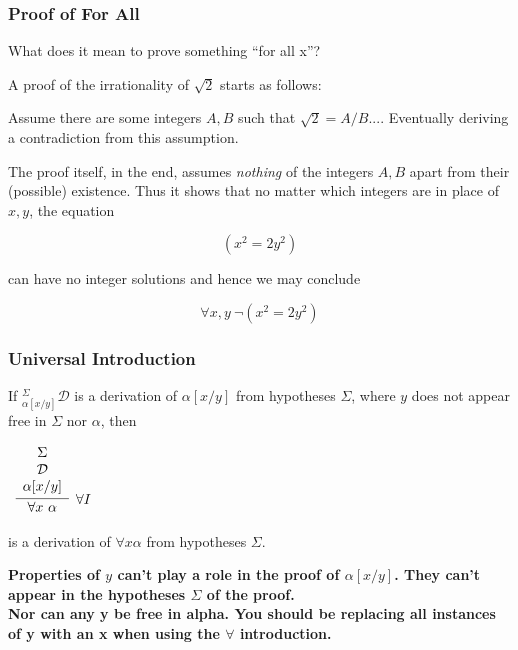 \documentclass{beamer}
\theoremstyle{indentDefn} \newtheorem{defn}[]{Definition}
\begin{document}
\begin{frame}
	\frametitle{Proof of For All}
	
	What does it mean to prove something ``for all x''?
	
	A proof of the irrationality of $\sqrt{2}$ starts as follows: 
	
	\begin{center}
		Assume there are some integers $A,B$ such that $\sqrt{2} = A/B$.... Eventually deriving a contradiction from this assumption.
	\end{center}
	
	The proof itself, in the end, assumes \emph{nothing} of the integers $A,B$ apart from their (possible) existence. Thus it shows that no matter which integers are in place of $x,y$, the equation 
	
	$$(x^{2} = 2y^{2})$$
	
	can have no integer solutions and hence we may conclude 
	
	$$\forall x,y \ \lnot (x^{2} = 2y^{2})$$
	
\end{frame}

\begin{frame}
	\frametitle{Universal Introduction}
	
	If $^{\Sigma}_{\alpha[x/y]}\mathcal{D}$ is a derivation of $\alpha[x/y]$ from hypotheses $\Sigma$, where $y$ does not appear free in $\Sigma$ nor $\alpha$, then
	
	\vspace{0.5cm}
	
	\begin{center}
		$\begin{array}{c}
		\infer[\forall I]{\forall x \ \alpha}{\begin{array}{c} 
			\Sigma \\
			\mathcal{D} \\ 
			\alpha[x/y]
			\end{array}}
		\end{array}$
	\end{center}
	
	is a derivation of $\forall x \alpha$ from hypotheses $\Sigma$. 
	
	\vspace{5mm} 
	
	{\bf Properties of $y$ can't play a role in the proof of $\alpha[x/y]$. They can't appear in the hypotheses $\Sigma$ of the proof.} \\
	
	{\bf Nor can any y be free in alpha. You should be replacing all instances of y with an x when using the $\forall$ introduction.}
	
\end{frame}
\end{document}
